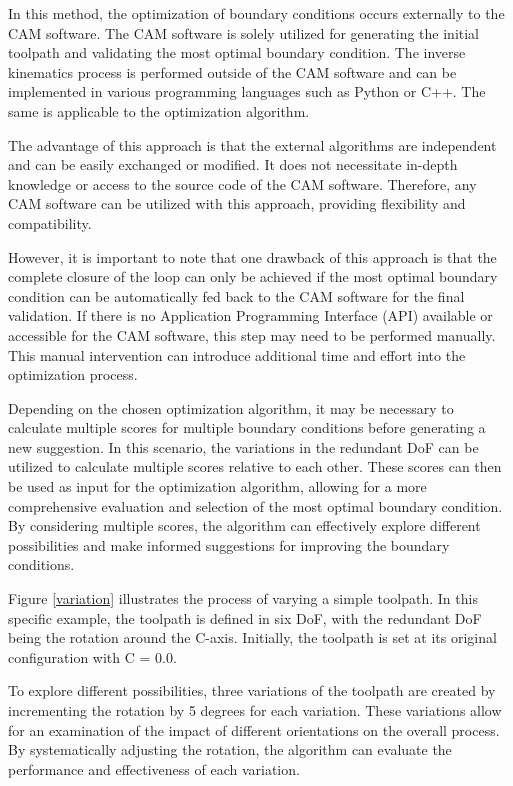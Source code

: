 In this method, the optimization of boundary conditions occurs externally to the CAM software. The CAM software is solely utilized for generating the initial toolpath and validating the most optimal boundary condition. The inverse kinematics process is performed outside of the CAM software and can be implemented in various programming languages such as Python or C++. The same is applicable to the optimization algorithm.

The advantage of this approach is that the external algorithms are independent and can be easily exchanged or modified. It does not necessitate in-depth knowledge or access to the source code of the CAM software. Therefore, any CAM software can be utilized with this approach, providing flexibility and compatibility.    

However, it is important to note that one drawback of this approach is that the complete closure of the loop can only be achieved if the most optimal boundary condition can be automatically fed back to the CAM software for the final validation. If there is no Application Programming Interface (API) available or accessible for the CAM software, this step may need to be performed manually. This manual intervention can introduce additional time and effort into the optimization process.

Depending on the chosen optimization algorithm, it may be necessary to calculate multiple scores for multiple boundary conditions before generating a new suggestion. In this scenario, the variations in the redundant DoF can be utilized to calculate multiple scores relative to each other. These scores can then be used as input for the optimization algorithm, allowing for a more comprehensive evaluation and selection of the most optimal boundary condition. By considering multiple scores, the algorithm can effectively explore different possibilities and make informed suggestions for improving the boundary conditions.

Figure \ref{variation} illustrates the process of varying a simple toolpath. In this specific example, the toolpath is defined in six DoF, with the redundant DoF being the rotation around the C-axis. Initially, the toolpath is set at its original configuration with C = 0.0.

To explore different possibilities, three variations of the toolpath are created by incrementing the rotation by 5 degrees for each variation. These variations allow for an examination of the impact of different orientations on the overall process. By systematically adjusting the rotation, the algorithm can evaluate the performance and effectiveness of each variation.


